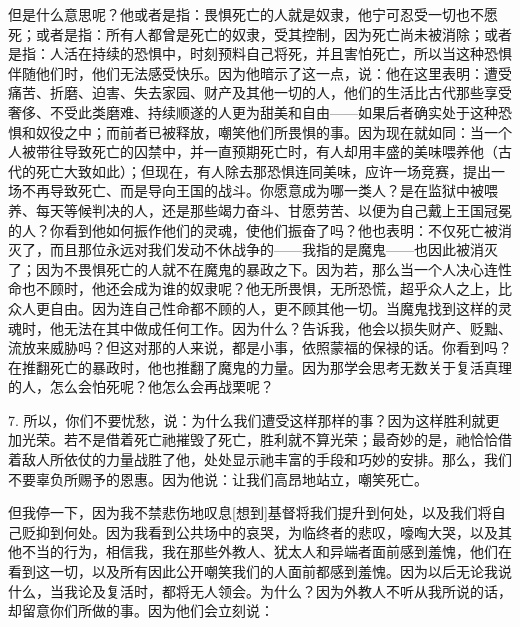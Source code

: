 但是什么意思呢？他或者是指：畏惧死亡的人就是奴隶，他宁可忍受一切也不愿死；或者是指：所有人都曾是死亡的奴隶，受其控制，因为死亡尚未被消除；或者是指：人活在持续的恐惧中，时刻预料自己将死，并且害怕死亡，所以当这种恐惧伴随他们时，他们无法感受快乐。因为他暗示了这一点，说：他在这里表明：遭受痛苦、折磨、迫害、失去家园、财产及其他一切的人，他们的生活比古代那些享受奢侈、不受此类磨难、持续顺遂的人更为甜美和自由——如果后者确实处于这种恐惧和奴役之中；而前者已被释放，嘲笑他们所畏惧的事。因为现在就如同：当一个人被带往导致死亡的囚禁中，并一直预期死亡时，有人却用丰盛的美味喂养他（古代的死亡大致如此）；但现在，有人除去那恐惧连同美味，应许一场竞赛，提出一场不再导致死亡、而是导向王国的战斗。你愿意成为哪一类人？是在监狱中被喂养、每天等候判决的人，还是那些竭力奋斗、甘愿劳苦、以便为自己戴上王国冠冕的人？你看到他如何振作他们的灵魂，使他们振奋了吗？他也表明：不仅死亡被消灭了，而且那位永远对我们发动不休战争的——我指的是魔鬼——也因此被消灭了；因为不畏惧死亡的人就不在魔鬼的暴政之下。因为若，那么当一个人决心连性命也不顾时，他还会成为谁的奴隶呢？他无所畏惧，无所恐慌，超乎众人之上，比众人更自由。因为连自己性命都不顾的人，更不顾其他一切。当魔鬼找到这样的灵魂时，他无法在其中做成任何工作。因为什么？告诉我，他会以损失财产、贬黜、流放来威胁吗？但这对那的人来说，都是小事，依照蒙福的保禄的话。你看到吗？在推翻死亡的暴政时，他也推翻了魔鬼的力量。因为那学会思考无数关于复活真理的人，怎么会怕死呢？他怎么会再战栗呢？\par

7. 所以，你们不要忧愁，说：为什么我们遭受这样那样的事？因为这样胜利就更加光荣。若不是借着死亡祂摧毁了死亡，胜利就不算光荣；最奇妙的是，祂恰恰借着敌人所依仗的力量战胜了他，处处显示祂丰富的手段和巧妙的安排。那么，我们不要辜负所赐予的恩惠。因为他说：让我们高昂地站立，嘲笑死亡。\par

但我停一下，因为我不禁悲伤地叹息[想到]基督将我们提升到何处，以及我们将自己贬抑到何处。因为我看到公共场中的哀哭，为临终者的悲叹，嚎啕大哭，以及其他不当的行为，相信我，我在那些外教人、犹太人和异端者面前感到羞愧，他们在看到这一切，以及所有因此公开嘲笑我们的人面前都感到羞愧。因为以后无论我说什么，当我论及复活时，都将无人领会。为什么？因为外教人不听从我所说的话，却留意你们所做的事。因为他们会立刻说：\par

